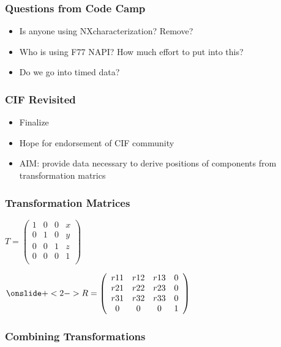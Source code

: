 \documentclass{beamer}
\begin{document}
\begin{frame}
\frametitle{Questions from Code Camp}
\begin{itemize}
\item Is anyone using NXcharacterization? Remove?
\item Who is using F77 NAPI? How much effort to put into this?
\item Do we go into timed data?
\end{itemize}
\end{frame}


\begin{frame}
\frametitle{CIF Revisited}
\begin{itemize}
\item Finalize
\item Hope for endorsement of CIF community
\item AIM: provide data necessary to derive positions of components from 
 transformation matrics
\end{itemize}
\end{frame}

\begin{frame} \frametitle{Transformation Matrices}
\begin{math}
T = \left( \begin{array}{cccc}
1 & 0 & 0 & x\\
0 & 1 & 0 & y\\
0 & 0 & 1 & z\\
0 & 0 & 0 & 1\\
\end{array} \right)
\end{math}

\begin{math}
\onslide+<2-> 
R = \left( \begin{array}{cccc}
r11 & r12 & r13 & 0\\
r21 & r22 & r23 & 0\\
r31 & r32 & r33 & 0\\
0 & 0 & 0 & 1\\
\end{array} \right)
\end{math}

\end{frame}

\begin{frame} \frametitle{Combining Transformations}
\begin{figure}[!ht]
\end{figure}
\end{frame}
\end{document}
